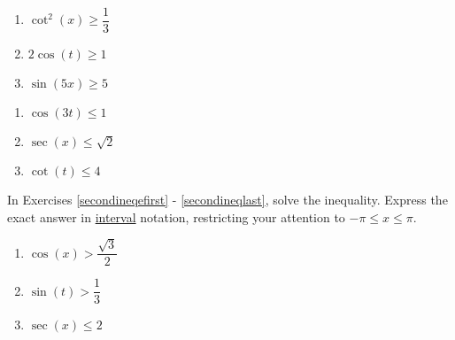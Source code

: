 \documentclass{ximera}
\begin{document}
\begin{multicols}{3}

\begin{enumerate}

\setcounter{enumi}{\value{HW}}

\item $\cot^{2} \left( x \right) \geq \dfrac{1}{3}$
\item $2\cos(t) \geq 1$ 
\item $\sin(5x) \geq 5$ 

\setcounter{HW}{\value{enumi}}

\end{enumerate}

\end{multicols}

\begin{multicols}{3}

\begin{enumerate}

\setcounter{enumi}{\value{HW}}

\item $\cos(3t) \leq 1$
\item $\sec(x) \leq \sqrt{2}$
\item $\cot(t) \leq 4$ \label{firstineqlast}

\setcounter{HW}{\value{enumi}}
\end{enumerate}
\end{multicols}

\pagebreak

In Exercises \ref{secondineqefirst} - \ref{secondineqlast}, solve the inequality.  Express the exact answer in \underline{interval} notation, restricting your attention to $-\pi \leq x \leq \pi$.

\begin{multicols}{3}

\begin{enumerate}

\setcounter{enumi}{\value{HW}}

\item $\cos \left( x \right) > \dfrac{\sqrt{3}}{2}$ \label{secondineqefirst}
\item  $\sin(t) > \dfrac{1}{3}$ 
\item $\sec \left( x \right) \leq 2$ 

\setcounter{HW}{\value{enumi}}

\end{enumerate}

\end{multicols}
\end{document}
